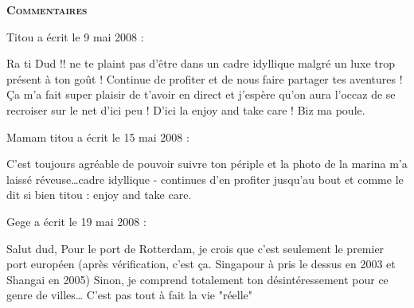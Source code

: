 \bigskip
\textbf{\textsc{Commentaires}}

\medskip
Titou a écrit le 9 mai 2008 :
\begin{displayquote}
Ra ti Dud !! ne te plaint pas d'être dans un cadre idyllique malgré un luxe trop présent à ton goût ! Continue de profiter et de nous faire partager tes aventures ! Ça m'a fait super plaisir de t'avoir en direct et j'espère qu'on aura l'occaz de se recroiser sur le net d'ici peu ! D'ici la enjoy and take care !
Biz ma poule.
\end{displayquote}

\medskip
Mamam titou a écrit le 15 mai 2008 :
\begin{displayquote}
C'est toujours agréable de pouvoir suivre ton périple et la photo de la marina m'a laissé réveuse\dots cadre idyllique - continues d'en profiter jusqu'au bout et comme le dit si bien titou : enjoy and take care.
\end{displayquote}

\medskip
Gege a écrit le 19 mai 2008 :
\begin{displayquote}
Salut dud,
Pour le port de Rotterdam, je crois que c'est seulement le premier port européen (après vérification, c'est ça. Singapour à pris le dessus en 2003 et Shangai en 2005)
Sinon, je comprend totalement ton désintéressement pour ce genre de villes\dots
C'est pas tout à fait la vie "réelle"
\end{displayquote}

\vfill

